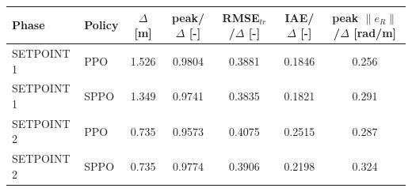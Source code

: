 \begin{tabular}{llccccc}
\toprule
Phase & Policy & $\Delta$ [m] & peak/$\Delta$ [-] & RMSE$_{tr}$/$\Delta$ [-] & IAE/$\Delta$ [-] & peak $\|e_R\|$/$\Delta$ [rad/m] \\
\midrule
SETPOINT 1 & PPO & 1.526 & 0.9804 & 0.3881 & 0.1846 & 0.256 \\
SETPOINT 1 & SPPO & 1.349 & 0.9741 & 0.3835 & 0.1821 & 0.291 \\
\midrule
SETPOINT 2 & PPO & 0.735 & 0.9573 & 0.4075 & 0.2515 & 0.287 \\
SETPOINT 2 & SPPO & 0.735 & 0.9774 & 0.3906 & 0.2198 & 0.324 \\
\bottomrule
\end{tabular}
